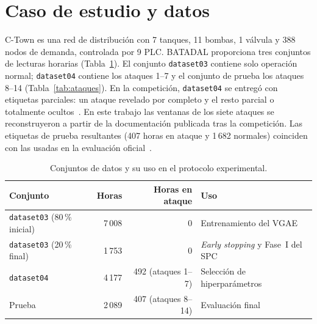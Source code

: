 \documentclass[11pt,a4paper]{article}
\begin{document}
\section{Caso de estudio y datos}

C-Town es una red de distribución con 7 tanques, 11 bombas, 1 válvula y 388 nodos de
demanda, controlada por 9 PLC. BATADAL proporciona tres conjuntos de lecturas
horarias (Tabla~\ref{tab:datos}). El conjunto \texttt{dataset03} contiene solo
operación normal; \texttt{dataset04} contiene los ataques 1--7 y el conjunto de prueba
los ataques 8--14 (Tabla~\ref{tab:ataques}). En la competición, \texttt{dataset04} se
entregó con etiquetas parciales: un ataque revelado por completo y el resto parcial o
totalmente ocultos~\cite{taormina2018}. En este trabajo las ventanas de los siete
ataques se reconstruyeron a partir de la documentación publicada tras la competición.
Las etiquetas de prueba resultantes (407 horas en ataque y 1\,682 normales) coinciden
con las usadas en la evaluación oficial~\cite{taormina2018}.

\begin{table}[t]
\centering
\caption{Conjuntos de datos y su uso en el protocolo experimental.}
\label{tab:datos}
\begin{tabular}{@{}lrrl@{}}
\toprule
Conjunto & Horas & Horas en ataque & Uso \\
\midrule
\texttt{dataset03} (80\,\% inicial) & 7\,008 & 0 & Entrenamiento del VGAE \\
\texttt{dataset03} (20\,\% final)  & 1\,753 & 0 & \emph{Early stopping} y Fase~I del SPC \\
\texttt{dataset04} & 4\,177 & 492 (ataques 1--7) & Selección de hiperparámetros \\
Prueba & 2\,089 & 407 (ataques 8--14) & Evaluación final \\
\bottomrule
\end{tabular}
\end{table}
\end{document}
